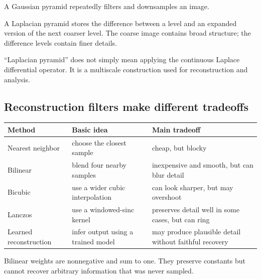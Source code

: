 A Gaussian pyramid repeatedly filters and downsamples an image.

A Laplacian pyramid stores the difference between a level and an expanded version of the next coarser level. The coarse image contains broad structure; the difference levels contain finer details.

``Laplacian pyramid'' does not simply mean applying the continuous Laplace differential operator. It is a multiscale construction used for reconstruction and analysis.

\subsection{Reconstruction filters make different tradeoffs}\label{04-visual-computing-ii-ch043-reconstruction-filters-make-different-tradeoffs}

{\def\LTcaptype{none} %
\begin{longtable}[]{@{}
  >{\raggedright\arraybackslash}p{}
  >{\raggedright\arraybackslash}p{}
  >{\raggedright\arraybackslash}p{}@{}}
\toprule\noalign{}
\begin{minipage}[b]{\linewidth}\raggedright
Method
\end{minipage} & \begin{minipage}[b]{\linewidth}\raggedright
Basic idea
\end{minipage} & \begin{minipage}[b]{\linewidth}\raggedright
Main tradeoff
\end{minipage} \\
\midrule\noalign{}
\endhead
\bottomrule\noalign{}
\endlastfoot
Nearest neighbor & choose the closest sample & cheap, but blocky \\
Bilinear & blend four nearby samples & inexpensive and smooth, but can blur detail \\
Bicubic & use a wider cubic interpolation & can look sharper, but may overshoot \\
Lanczos & use a windowed-sinc kernel & preserves detail well in some cases, but can ring \\
Learned reconstruction & infer output using a trained model & may produce plausible detail without faithful recovery \\
\end{longtable}
}

Bilinear weights are nonnegative and sum to one. They preserve constants but cannot recover arbitrary information that was never sampled.

